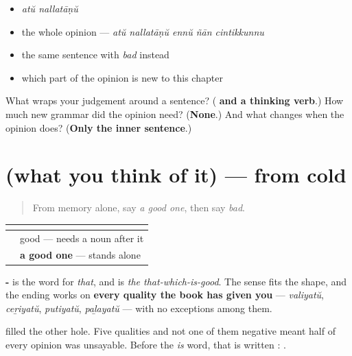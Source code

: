 \begin{itemize}
\raggedright
  \item \emph{atŭ nallatāṇŭ}
  \item the whole opinion — \emph{atŭ nallatāṇŭ ennŭ ñān cintikkunnu}
  \item the same sentence with \emph{bad} instead
  \item which part of the opinion is new to this chapter
\end{itemize}

\begin{tcolorbox}[breakable,colback=teal!4,colframe=teal!35!black,title={Before you move on}]
What wraps your judgement around a sentence? (\textbf{ and a thinking verb}.) How much new grammar did the opinion need? (\textbf{None}.) And what changes when the opinion does? (\textbf{Only the inner sentence}.)
\end{tcolorbox}
\section[(what you think of it)]{(what you think of it) — from cold}

\label{lesson:ML-R89-opinion-recall}



\begin{quote}
From memory alone, say \emph{a good one}, then say \emph{bad}.
\end{quote}

\begin{grammarlens}[title={Grammar Lens: a quality standing on its own}]
\noindent
\begin{tabularx}{\linewidth}{@{}>{\raggedright\arraybackslash}X>{\raggedright\arraybackslash}X@{}}
\toprule
\textbf{} & \textbf{} \\
\midrule
\textbf{\ml{നല്ല}} & good — needs a noun after it \\
\textbf{\ml{നല്ലത്}} & \textbf{a good one} — stands alone \\
\bottomrule
\end{tabularx}

\textbf{-} is the word for \emph{that}, and \textbf{} is \emph{the that-which-is-good}. The sense fits the shape, and the ending works on \textbf{every quality the book has given you} — \emph{valiyatŭ}, \emph{ceṟiyatŭ}, \emph{putiyatŭ}, \emph{paḻayatŭ} — with no exceptions among them.

\textbf{} filled the other hole. Five qualities and not one of them negative meant half of every opinion was unsayable. Before the \emph{is} word, that \textbf{} is written \textbf{}: \textbf{}.
\end{grammarlens}

